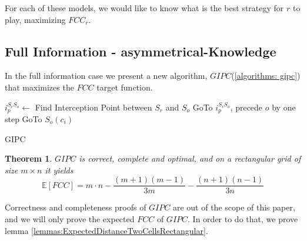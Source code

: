 \documentclass[letterpaper, 10 pt, conference]{ieeeconf}  %
\newtheorem{theorem}{Theorem}[section]
\newcommand\rob{\ensuremath{r}\xspace}
\newcommand\opp{\ensuremath{o}\xspace}
\newcommand{\fcc}{\ensuremath{FCC}\xspace}
\newcommand{\gipc}{\ensuremath{GIPC}\xspace}
\begin{document}
For each of these models, we would like to know what is the best strategy for \rob to play, maximizing $\fcc_\rob$.

\subsection{Full Information - asymmetrical-Knowledge}

In the full information case we present a new algorithm, \gipc (\ref{algorithms: gipc}) that maximizes the \fcc target function.
\begin{algorithm}
\begin{algorithmic}
	\STATE $i_p^{S_\rob S_\opp} \leftarrow $ Find Interception Point between $S_\rob$ and $S_\opp$
    \STATE GoTo $i_p^{S_\rob S_\opp}$, precede \opp by one step
    \LOOP
        	\STATE GoTo $S_\opp(c_i)$
        \ENDIF
    \ENDLOOP
  
\end{algorithmic}
\caption{GIPC\label{algorithms: gipc}}
\end{algorithm}

\begin{theorem}
\gipc is correct, complete and optimal, and on a rectangular grid of size $m\times n$ it yields 
\begin{dmath*}[compact]
\mathbb{E}[\fcc] = m\cdot n-\frac{\left(m+1\right)\left(m-1\right)}{3m}-\frac{\left(n+1\right)\left(n-1\right)}{3n}
\end{dmath*}
\end{theorem}

% 

Correctness and completeness proofs of \gipc are out of the scope of this paper, and we will only prove the expected \fcc of \gipc.
In order to do that, we prove lemma \ref{lemmas:ExpectedDistanceTwoCellsRectangular}.
\end{document}
